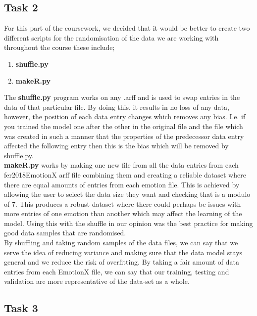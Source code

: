\documentclass[12pt]{article}
\begin{document}
\subsection{Task 2}

For this part of the coursework, we decided that it would be better to create two different scripts for the randomisation of the data we are working with throughout the course these include;

\begin{enumerate}
	\item \textbf{shuffle.py}
	\item \textbf{makeR.py}
\end{enumerate}

The \textbf{shuffle.py} program works on any .arff and is used to swap entries in the data of that particular file. By doing this, it results in no loss of any data, however, the position of each data entry changes which removes any bias. I.e. if you trained the model one after the other in the original file and the file which was created in such a manner that the properties of the predecessor data entry affected the following entry then this is the bias which will be removed by shuffle.py.\\

\textbf{makeR.py} works by making one new file from all the data entries from each fer2018EmotionX arff file combining them and creating a reliable dataset where there are equal amounts of entries from each emotion file. This is achieved by allowing the user to select the data size they want and checking that is a modulo of 7. This produces a robust dataset where there could perhaps be issues with more entries of one emotion than another which may affect the learning of the model. Using this with the shuffle in our opinion was the best practice for making good data samples that are randomised.\\

By shuffling and taking random samples of the data files, we can say that we serve the idea of reducing variance and making sure that the data model stays general and we reduce the risk of overfitting. By taking a fair amount of data entries from each EmotionX file, we can say that our training, testing and validation are more representative of the data-set as a whole.\\

\newpage

\subsection{Task 3}
\end{document}
